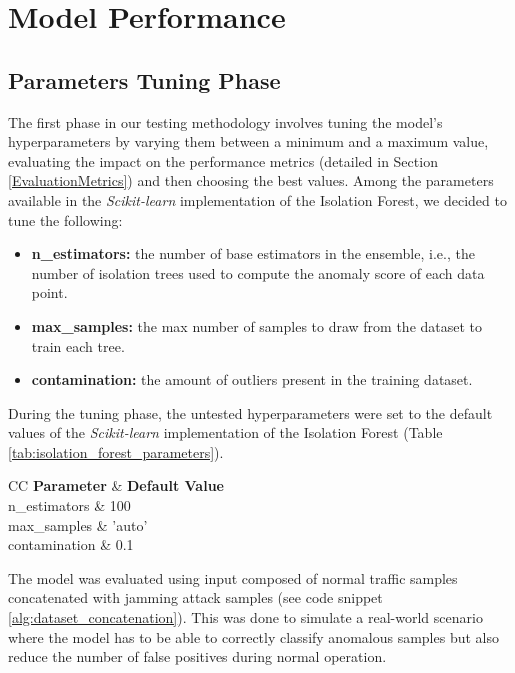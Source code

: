 \documentclass[futureinternet,article,submit,pdftex,moreauthors]{Definitions/mdpi}
\begin{document}
\section{Model Performance }

\subsection{Parameters Tuning Phase}

The first phase in our testing methodology involves tuning the model's hyperparameters by varying them between a minimum and a maximum value, evaluating the impact on the performance metrics (detailed in Section \ref{EvaluationMetrics}) and then choosing the best values.
Among the parameters available in the \textit{Scikit-learn} implementation of the Isolation Forest, we decided to tune the following: 

\begin{itemize}
	\item \textbf{n\_estimators:} the number of base estimators in the ensemble, i.e., the number of isolation trees used to compute the anomaly score of each data point. 
	\item \textbf{max\_samples:} the max number of samples to draw from the dataset to train each tree.
	\item \textbf{contamination:} the amount of outliers present in the training dataset.  
\end{itemize} 
During the tuning phase, the untested hyperparameters were set to the default values of the \textit{Scikit-learn} implementation of the Isolation Forest (Table \ref{tab:isolation_forest_parameters}).

\begin{table}[H]
	\caption{Scikit-Learn Isolation Forest hyperparameters default values.\label{tab:isolation_forest_parameters}}
	\begin{tabularx}{\textwidth}{CC}
	\toprule
	\textbf{Parameter} & \textbf{Default Value} \\
	\midrule
	n\_estimators & 100 \\
	max\_samples & 'auto' \\
	contamination & 0.1 \\
	\bottomrule
	\end{tabularx}
\end{table}

The model was evaluated using input composed of normal traffic samples concatenated with jamming attack samples (see code snippet \ref{alg:dataset_concatenation}). 
This was done to simulate a real-world scenario where the model has to be able to correctly classify anomalous samples but also reduce the number of false positives during normal operation. 
\end{document}
